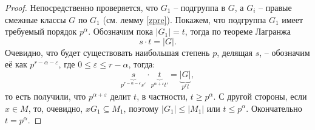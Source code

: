 \documentclass{article}
\begin{document}
\begin{proof}
    Непосредственно проверяется, что $G_1$ -- подгруппа в $G$, а $G_i$ -- правые смежные классы $G$ по $G_1$ (см. лемму \ref{zpre}). Покажем, что подгруппа $G_1$ имеет требуемый порядок $p^\alpha$. Обозначим пока $|G_1| = t$, тогда по теореме Лагранжа $$ s \cdot t = |G|. $$ Очевидно, что будет существовать наибольшая степень $p$, делящая $s$, -- обозначим её как $p^{r - \alpha -\varepsilon}$, где $ 0 \leqslant \varepsilon \leqslant r - \alpha$, тогда: $$ \underbrace{s}_{p^{r - \alpha -\varepsilon} s'} \cdot 
 \underbrace{t}_{p^{\alpha + \varepsilon} t'} =  \underbrace{|G|}_{p^r l}, $$ то есть получили, что $p^{\alpha + \varepsilon}$ делит $t$, в частности, $t \geqslant p^\alpha$. С другой стороны, если $x \in M$, то, очевидно, $xG_1 \subseteq M_1 $, поэтому $|G_1| \leqslant |M_1|$ или $t \leqslant p^\alpha$. Окончательно $t = p^\alpha$.
\end{proof}
\end{document}
